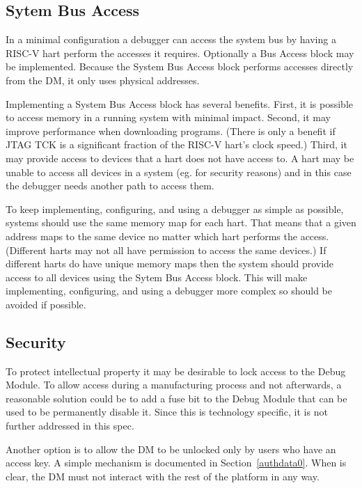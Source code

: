 \documentclass{article}
\begin{document}
\subsection{Sytem Bus Access}

In a minimal configuration a debugger can access the system bus by having a
RISC-V hart perform the accesses it requires. Optionally a Bus Access block may
be implemented. Because the System Bus Access block performs accesses directly
from the DM, it only uses physical addresses.

Implementing a System Bus Access block has several benefits.
First, it is possible to
access memory in a running system with minimal impact.  Second, it may improve
performance when downloading programs. (There is only a benefit if JTAG TCK is a
significant fraction of the RISC-V hart's clock speed.)  Third, it may provide
access to devices that a hart does not have access to. A hart may be unable to
access all devices in a system (eg. for security reasons) and in this case the
debugger needs another path to access them.

To keep implementing, configuring, and using a debugger as simple as possible,
systems should use the same memory map for each hart. That means that a given
address maps to the same device no matter which hart performs the access.
(Different harts may not all have permission to access the same devices.) If
different harts do have unique memory maps then the system should provide
access to all devices using the Sytem Bus Access block.
This will make implementing,
configuring, and using a debugger more complex so should be avoided if
possible.

\subsection{Security}

To protect intellectual property it may be desirable to lock access to the
Debug Module.  To allow access during a manufacturing process and not
afterwards, a reasonable solution could be to add a fuse bit to the Debug
Module that can be used to be permanently disable it. Since this is technology
specific, it is not further addressed in this spec.

Another option is to allow the DM to be unlocked only by users who  have an
access key. A simple mechanism is documented in Section~\ref{authdata0}. When
\Fauthenticated is clear, the DM must not interact with the rest of the
platform in any way.
\end{document}
